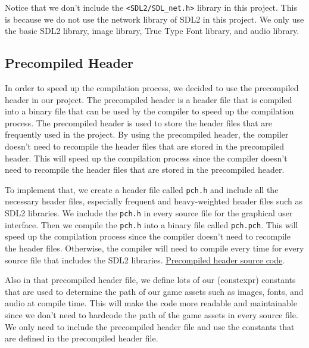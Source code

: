 \hspace{1cm} Notice that we don't include the \texttt{<SDL2/SDL\_net.h>} library in this project. This is because we do not use the network library of SDL2 in this project. We only use the basic SDL2 library, image library, True Type Font library, and audio library.

\subsection{Precompiled Header}
\label{subsec:precompiled-header}

\hspace{1cm} In order to speed up the compilation process, we decided to use the precompiled header in our project. The precompiled header is a header file that is compiled into a binary file that can be used by the compiler to speed up the compilation process. The precompiled header is used to store the header files that are frequently used in the project. By using the precompiled header, the compiler doesn't need to recompile the header files that are stored in the precompiled header. This will speed up the compilation process since the compiler doesn't need to recompile the header files that are stored in the precompiled header.

\vspace{0.5cm}

\hspace{1cm} To implement that, we create a header file called \texttt{pch.h} and include all the necessary header files, especially frequent and heavy-weighted header files such as SDL2 libraries. We include the \texttt{pch.h} in every source file for the graphical user interface. Then we compile the \texttt{pch.h} into a binary file called \texttt{pch.pch}. This will speed up the compilation process since the compiler doesn't need to recompile the header files. Otherwise, the compiler will need to compile every time for every source file that includes the SDL2 libraries. \href{https://github.com/anhtri2407/Poker/blob/main/include/pch.h}{Precompiled header source code}.

\vspace{0.5cm}

\hspace{1cm} Also in that precompiled header file, we define lots of our (constexpr) constants that are used to determine the path of our game assets such as images, fonts, and audio at compile time. This will make the code more readable and maintainable since we don't need to hardcode the path of the game assets in every source file. We only need to include the precompiled header file and use the constants that are defined in the precompiled header file.

